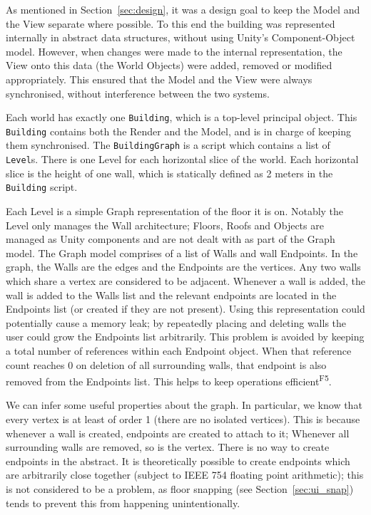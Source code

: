 As mentioned in Section~\ref{sec:design}, it was a design goal to keep the Model and the View separate where possible. To this end the building was represented internally in abstract data structures, without using Unity's Component-Object model. However, when changes were made to the internal representation, the View onto this data (the World Objects) were added, removed or modified appropriately. This ensured that the Model and the View were always synchronised, without interference between the two systems.

Each world has exactly one \verb|Building|, which is a top-level principal object. This \verb|Building| contains both the Render and the Model, and is in charge of keeping them synchronised. The \verb|BuildingGraph| is a script which contains a list of \verb|Level|s. There is one Level for each horizontal slice of the world. Each horizontal slice is the height of one wall, which is statically defined as 2 meters in the \verb|Building| script.

Each Level is a simple Graph representation of the floor it is on. Notably the Level only manages the Wall architecture; Floors, Roofs and Objects are managed as Unity components and are not dealt with as part of the Graph model. The Graph model comprises of a list of Walls and wall Endpoints. In the graph, the Walls are the edges and the Endpoints are the vertices. Any two walls which share a vertex are considered to be adjacent. Whenever a wall is added, the wall is added to the Walls list and the relevant endpoints are located in the Endpoints list (or created if they are not present). Using this representation could potentially cause a memory leak; by repeatedly placing and deleting walls the user could grow the Endpoints list arbitrarily. This problem is avoided by keeping a total number of references within each Endpoint object. When that reference count reaches 0 on deletion of all surrounding walls, that endpoint is also removed from the Endpoints list. This helps to keep operations efficient\textsuperscript{F5}.

We can infer some useful properties about the graph. In particular, we know that every vertex is at least of order 1 (there are no isolated vertices). This is because whenever a wall is created, endpoints are created to attach to it; Whenever all surrounding walls are removed, so is the vertex. There is no way to create endpoints in the abstract. It is theoretically possible to create endpoints which are arbitrarily close together (subject to IEEE 754 floating point arithmetic); this is not considered to be a problem, as floor snapping (see Section~\ref{sec:ui_snap}) tends to prevent this from happening unintentionally.

